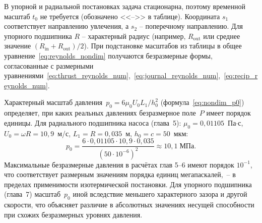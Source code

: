 \begin{table}[!ht]
\centering
\caption{Характерные масштабы для безразмерной постановки}
\label{tab:nondim_scales}
\end{table}

\FloatBarrier

В упорной и радиальной постановках задача стационарна, поэтому временной масштаб $t_0$ не требуется (обозначено <<-->>{} в таблице). Координата $s_1$ соответствует направлению увлечения, а $s_2$ -- поперечному направлению. Для упорного подшипника $R$ -- характерный радиус (например, $R_{\mathrm{out}}$ или среднее значение $(R_{\mathrm{in}} + R_{\mathrm{out}})/2$). При подстановке масштабов из таблицы в общее уравнение~\eqref{eq:reynolds_nondim} получаются безразмерные формы, согласованные с размерными уравнениями~\eqref{eq:thrust_reynolds_num},~\eqref{eq:journal_reynolds_num},~\eqref{eq:recip_reynolds_num}.

Характерный масштаб давления~$p_0 = 6\mu_0 U_0 L_1 / h_0^2$
(формула~\eqref{eq:nondim_p0}) определяет, при каких реальных
давлениях безразмерное поле~$P$ имеет порядок единицы.
Для радиального подшипника насоса (глава~5): $\mu_0 = 0{,}01105$~Па$\cdot$с,
$U_0 = \omega R = 10{,}9$~м/с, $L_1 = R = 0{,}035$~м,
$h_0 = c = 50$~мкм:
%
\begin{equation}
  p_0 = \frac{6 \cdot 0{,}01105 \cdot 10{,}9
    \cdot 0{,}035}{(50 \cdot 10^{-6})^2}
  \approx 10{,}1 \;\text{МПа}.
  \label{eq:p0_example}
\end{equation}
%
Максимальные безразмерные давления в расчётах глав 5--6 имеют
порядок $10^{-1}$, что соответствует размерным значениям
порядка единиц мегапаскалей,~-- в пределах применимости
изотермической постановки. Для упорного подшипника (глава~7)
масштаб~$p_0$ иной вследствие меньшего характерного зазора
и другой скорости, что объясняет различие в абсолютных
значениях несущей способности при схожих безразмерных уровнях
давления.

